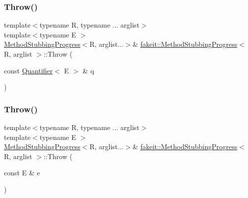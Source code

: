 \mbox{\label{structfakeit_1_1MethodStubbingProgress_a93c74210adfc0ec4662aff15f78834c7}} 
\subsubsection{\texorpdfstring{Throw()}{Throw()}\hspace{0.1cm}{\footnotesize\ttfamily [5/27]}}
{\footnotesize\ttfamily template$<$typename R, typename ... arglist$>$ \\
template$<$typename E $>$ \\
\mbox{\hyperlink{structfakeit_1_1MethodStubbingProgress}{Method\+Stubbing\+Progress}}$<$R, arglist...$>$\& \mbox{\hyperlink{structfakeit_1_1MethodStubbingProgress}{fakeit\+::\+Method\+Stubbing\+Progress}}$<$ R, arglist $>$\+::Throw (\begin{DoxyParamCaption}\item[{const \mbox{\hyperlink{structfakeit_1_1Quantifier}{Quantifier}}$<$ E $>$ \&}]{q }\end{DoxyParamCaption})\hspace{0.3cm}{\ttfamily [inline]}}

\mbox{\label{structfakeit_1_1MethodStubbingProgress_ae3da30d02ba5de4bfa82f51bba5602c3}} 
\subsubsection{\texorpdfstring{Throw()}{Throw()}\hspace{0.1cm}{\footnotesize\ttfamily [6/27]}}
{\footnotesize\ttfamily template$<$typename R, typename ... arglist$>$ \\
template$<$typename E $>$ \\
\mbox{\hyperlink{structfakeit_1_1MethodStubbingProgress}{Method\+Stubbing\+Progress}}$<$R, arglist...$>$\& \mbox{\hyperlink{structfakeit_1_1MethodStubbingProgress}{fakeit\+::\+Method\+Stubbing\+Progress}}$<$ R, arglist $>$\+::Throw (\begin{DoxyParamCaption}\item[{const E \&}]{e }\end{DoxyParamCaption})\hspace{0.3cm}{\ttfamily [inline]}}

